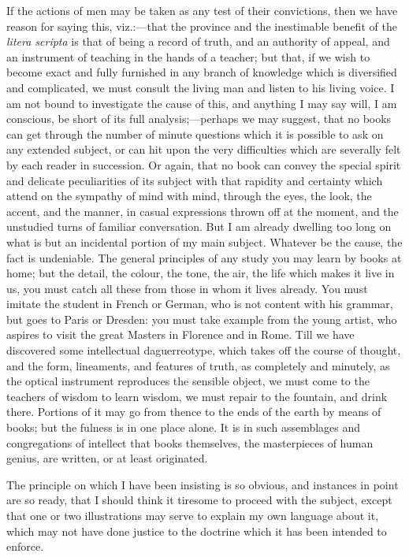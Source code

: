 If the actions of men may be taken as any test of their
convictions, then we have reason for saying this, viz.:—that the
province and the inestimable benefit of the \emph{litera scripta} is
that of being a record of truth, and an authority of appeal, and an
instrument of teaching in the hands of a teacher; but that, if we wish
to become exact and fully furnished in any branch of knowledge which
is diversified and complicated, we must consult the living man and
listen to his living voice. I am not bound to investigate the cause of
this, and anything I may say will, I am conscious, be short of its
full analysis;—perhaps we may suggest, that no books can get through
the number of minute questions which it is possible to ask on any
extended subject, or can hit upon the very difficulties which are
severally felt by each reader in succession. Or again, that no book
can convey the special spirit and delicate peculiarities of its subject with that rapidity and certainty which attend on the sympathy
of mind with mind, through the eyes, the look, the accent, and the
manner, in casual expressions thrown off at the moment, and the
unstudied turns of familiar conversation. But I am already dwelling
too long on what is but an incidental portion of my main subject.
Whatever be the cause, the fact is undeniable. The general principles
of any study you may learn by books at home; but the detail, the
colour, the tone, the air, the life which makes it live in us, you
must catch all these from those in whom it lives already. You must
imitate the student in French or German, who is not content with his
grammar, but goes to Paris or Dresden: you must take example from the
young artist, who aspires to visit the great Masters in Florence and
in Rome. Till we have discovered some intellectual daguerreotype,
which takes off the course of thought, and the form, lineaments, and
features of truth, as completely and minutely, as the optical
instrument reproduces the sensible object, we must come to the
teachers of wisdom to learn wisdom, we must repair to the fountain,
and drink there. Portions of it may go from thence to the ends of the
earth by means of books; but the fulness is in one place alone. It is
in such assemblages and congregations of intellect that books
themselves, the masterpieces of human genius, are written, or at least
originated.

The principle on which I have been insisting is so obvious, and
instances in point are so ready, that I should think it tiresome to
proceed with the subject, except that one or two illustrations may
serve to explain my own language about it, which may not have done
justice to the doctrine which it has been intended to enforce.

